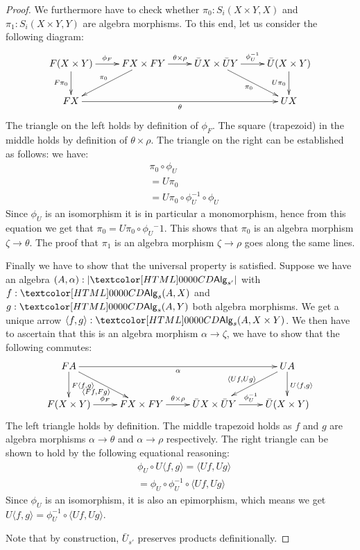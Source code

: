 \begin{proof}
  We furthermore have to check whether $\pi_0 : S_i (X \times Y, X)$
  and $\pi_1 : S_i (X \times Y, Y)$ are algebra morphisms. To this
  end, let us consider the following diagram:
  $$
  \xymatrix{
    F(X \times Y) \ar[r]^{\phi_F} \ar[d]_{F \pi_0}
    &FX \times FY \ar[r]^{\theta \times \rho} \ar[dl]_{\pi_0}
    &\bar{U}X \times \bar{U}Y \ar[r]^{\phi_U^{-1}} \ar[dr]_{\pi_0}
    &\bar{U}(X \times Y) \ar[d]_{U \pi_0}
    \\
    FX \ar[rrr]_{\theta} &&&UX
  }
  $$
  The triangle on the left holds by definition of $\phi_F$. The square
  (trapezoid) in the middle holds by definition of
  $\theta \times \rho$. The triangle on the right can be established
  as follows: we have:
  \begin{align*}
    &\pi_0 \circ \phi_U \\
    &= U \pi_0 \\
    &= U \pi_0 \circ \phi_U^{-1} \circ \phi_U
  \end{align*}
  Since $\phi_U$ is an isomorphism it is in particular a monomorphism,
  hence from this equation we get that
  $\pi_0 = U \pi_0 \circ \phi_U{^-1}$. This shows that $\pi_0$ is an
  algebra morphism $\zeta \to \theta$. The proof that $\pi_1$ is an
  algebra morphism $\zeta \to \rho$ goes along the same lines.

  Finally we have to show that the universal property is
  satisfied. Suppose we have an algebra $(A,\alpha) : | \Alg_{s'} |$
  with $f : \Alg_s(A,X)$ and $g : \Alg_s(A,Y)$ both algebra
  morphisms. We get a unique arrow
  $\langle f , g \rangle : \Alg_s(A , X \times Y)$. We then have to
  ascertain that this is an algebra morphism $\alpha \to \zeta$, \ie
  we have to show that the following commutes:
  $$
  \xymatrix{
    FA \ar[rrr]_{\alpha} \ar[d]^{F \langle f , g \rangle} \ar[dr]_{\langle Ff , Fg \rangle}
    &&&UA \ar[d]^{U \langle f , g \rangle}
    \ar[dl]_{\langle Uf , Ug \rangle}
    \\
    F(X \times Y) \ar[r]^{\phi_F} 
    &FX \times FY \ar[r]^{\theta \times \rho}
    &\bar{U}X \times \bar{U}Y \ar[r]^{\phi_U^{-1}}
    &\bar{U}(X \times Y) 
  }
  $$
  The left triangle holds by definition. The middle trapezoid holds as
  $f$ and $g$ are algebra morphisms $\alpha \to \theta$ and
  $\alpha \to \rho$ respectively. The right triangle can be shown to
  hold by the following equational reasoning:
  \begin{align*}
    &\phi_U \circ U \langle f , g \rangle = \langle U f , U g \rangle \\
    &= \phi_U \circ \phi_U^{-1} \circ \langle U f , U g \rangle
  \end{align*}
  Since $\phi_U$ is an isomorphism, it is also an epimorphism, which
  means we get
  $U \langle f , g \rangle = \phi_U^{-1} \circ \langle U f , U g
  \rangle$.

  Note that by construction, $\bar{U}_{s'}$ preserves products
  definitionally.
\end{proof}

